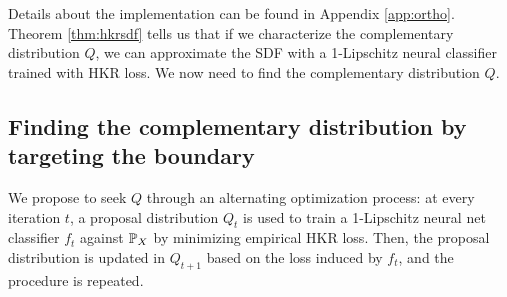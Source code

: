 
Details about the implementation can be found in Appendix \ref{app:ortho}. Theorem \ref{thm:hkrsdf} tells us that if we characterize the complementary distribution $Q$, we can approximate the SDF with a 1-Lipschitz neural classifier trained with HKR loss. We now need to find the complementary distribution $Q$.


\subsection{Finding the complementary distribution by targeting the boundary}\label{sec:findcompl}

We propose to seek $Q$ through an alternating optimization process: at every iteration $t$, a proposal distribution $Q_t$ is used to train a 1-Lipschitz neural net classifier $f_t$ against $\mathbb{P}_X$ by minimizing empirical HKR loss. Then, the proposal distribution is updated in $Q_{t+1}$ based on the loss induced by $f_t$, and the procedure is repeated. %

